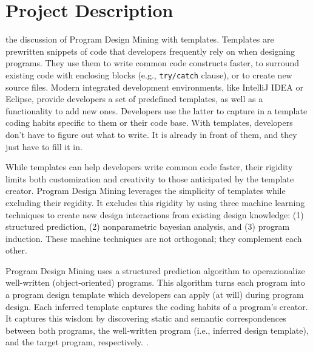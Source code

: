 \chapter{Project Description}{}
\label{sec:related}

 the discussion of Program Design Mining with templates. 
Templates are prewritten snippets of code that developers frequently rely on when 
designing programs. They use them to write common code constructs faster, to 
surround existing code with enclosing blocks (e.g., \texttt{try/catch} clause), or to 
create new source files. Modern integrated development environments, like IntelliJ IDEA 
or Eclipse, provide developers a set of predefined templates, as well as a functionality 
to add new ones. Developers use the latter to capture in a template coding habits 
specific to them or their code base. With templates, developers don't have to figure 
out what to write. It is already in front of them, and they just have to fill it in.  

While templates can help developers write common code faster, their rigidity limits 
both customization and creativity to those anticipated by the template creator. 
Program Design Mining leverages the simplicity of templates while excluding their 
regidity. It excludes this rigidity by using three machine learning techniques 
to create new design interactions from existing design knowledge: (1) structured 
prediction, (2) nonparametric bayesian analysis, and (3) program induction. These 
machine techniques are not orthogonal; they complement each other. 

Program Design Mining uses a structured prediction algorithm to operazionalize 
well-written (object-oriented) programs. This algorithm turns each program into a 
program design template which developers can apply (at will) during program design. 
Each inferred template captures the coding habits of a program's creator. It captures 
this wisdom by discovering static and semantic correspondences between both programs, 
the well-written program (i.e., inferred design template), and the target program, 
respectively. .


%
%
%
%
%
%

